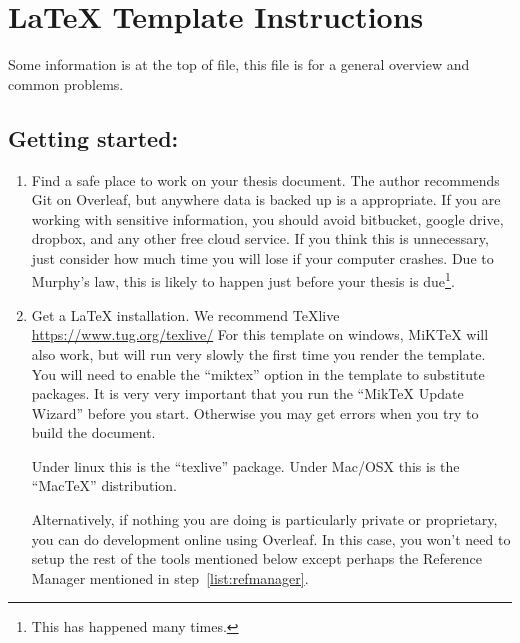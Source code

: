 \section{LaTeX Template Instructions}
Some information is at the top of  file, this file is for a general overview and common problems.

\subsection{Getting started:}
\begin{enumerate}
\item Find a safe place to work on your thesis document.
  The author recommends Git on Overleaf, but anywhere data is backed up is a appropriate.
  If you are working with sensitive information, you should avoid bitbucket, google drive, dropbox, and any other free cloud service.
  If you think this is unnecessary, just consider how much time you will lose if your computer crashes.
   Due to Murphy's law, this is likely to happen just before your thesis is due\footnote{This has happened many times.}.

 \item Get a LaTeX installation.  We recommend TeXlive \url{https://www.tug.org/texlive/}
   For this template on windows, MiKTeX will also work, but will run very slowly the first time you render the template.
   You will need to enable the ``miktex'' option in the template to substitute packages.
   It is very very important that you run the ``MikTeX Update Wizard'' before you start.
   Otherwise you may get errors when you try to build the document.

   Under linux this is the ``texlive'' package.
   Under Mac/OSX this is the ``MacTeX'' distribution.

   Alternatively, if nothing you are doing is particularly private or proprietary, you can do development online using Overleaf.
   In this case, you won't need to setup the rest of the tools mentioned below except perhaps the Reference Manager mentioned in step~\ref{list:refmanager}.
   


\end{enumerate}
